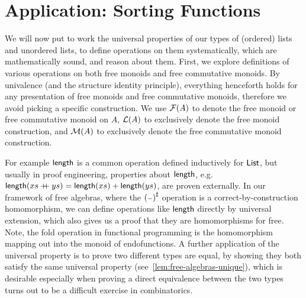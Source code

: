 \section{Application: Sorting Functions}
\label{sec:application}

We will now put to work the universal properties of our types of (ordered) lists and unordered lists,
to define operations on them systematically, which are mathematically sound, and reason about them.
%
First, we explore definitions of various operations on both free monoids and free commutative monoids.
%
By univalence (and the structure identity principle), everything henceforth holds for any presentation of free monoids
and free commutative monoids, therefore we avoid picking a specific construction.
%
We use $\mathcal{F}(A)$ to denote the free monoid or free commutative monoid on $A$, $\mathcal{L}(A)$ to exclusively denote the free
monoid construction, and $\mathcal{M}(A)$ to exclusively denote the free commutative monoid construction.

%
For example $\operatorname{\mathsf{length}}$ is a common operation defined inductively for $\operatorname{\mathsf{List}}$,
but usually in proof engineering, properties about $\operatorname{\mathsf{length}}$, e.g.
$\operatorname{\mathsf{length}}(xs \mathbin{+\kern -0.4em+} ys) = \operatorname{\mathsf{length}}(xs) + \operatorname{\mathsf{length}}(ys)$,
are proven externally.
%
In our framework of free algebras, where the $\ext{(\blank)}$ operation is a correct-by-construction homomorphism,
we can define operations like $\operatorname{\mathsf{length}}$ directly by universal extension,
which also gives us a proof that they are homomorphisms for free.
Note, the fold operation in functional programming is the homomorphism mapping out into the monoid of endofunctions.
%
A further application of the universal property is to prove two different types are equal, by showing they both satisfy
the same universal property (see~\cref{lem:free-algebras-unique}), which is desirable especially when proving a direct
equivalence between the two types turns out to be a difficult exercise in combinatorics.

